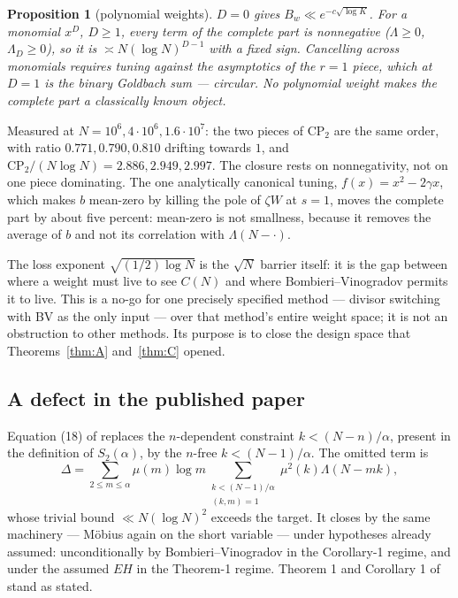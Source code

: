 \documentclass[11pt,a4paper]{article}
\theoremstyle{plain}
\newtheorem{proposition}[theorem]{Proposition}
\theoremstyle{definition}
\begin{document}
\begin{proposition}[polynomial weights]\label{prop:Dpp}
$D=0$ gives $B_w\ll e^{-c\sqrt{\log K}}$. For a monomial $x^D$,
$D\ge1$, every term of the complete part is nonnegative
($\Lambda\ge0$, $\Lambda_D\ge0$), so it is $\asymp N(\log N)^{D-1}$
with a fixed sign. Cancelling across monomials requires tuning against
the asymptotics of the $r=1$ piece, which at $D=1$ is the binary
Goldbach sum --- circular. No polynomial weight makes the complete
part a classically known object.
\end{proposition}

Measured at $N=10^6,4\cdot10^6,1.6\cdot10^7$: the two pieces of
$\mathrm{CP}_2$ are the same order, with ratio $0.771,0.790,0.810$
drifting towards $1$, and $\mathrm{CP}_2/(N\log N) = 2.886, 2.949,
2.997$. The closure rests on nonnegativity, not on one piece
dominating. The one analytically canonical tuning,
$f(x)=x^2-2\gamma x$, which makes $b$ mean-zero by killing the pole of
$\zeta W$ at $s=1$, moves the complete part by about five percent:
mean-zero is not smallness, because it removes the average of $b$ and
not its correlation with $\Lambda(N-\cdot)$.

The loss exponent $\sqrt{(1/2)\log N}$ is the $\sqrt N$ barrier itself:
it is the gap between where a weight must live to see $C(N)$ and where
Bombieri--Vinogradov permits it to live. This is a no-go for one
precisely specified method --- divisor switching with BV as the only
input --- over that method's entire weight space; it is not an
obstruction to other methods. Its purpose is to close the design space
that Theorems~\ref{thm:A} and~\ref{thm:C} opened.

\subsection{A defect in the published paper}

Equation (18) of \cite{HL} replaces the $n$-dependent constraint
$k < (N-n)/\alpha$, present in the definition of $S_2(\alpha)$, by the
$n$-free $k < (N-1)/\alpha$. The omitted term is
\[
  \Delta = \sum_{2\le m\le\alpha}\mu(m)\log m
    \sum_{\substack{k<(N-1)/\alpha\\ (k,m)=1}}\mu^2(k)\Lambda(N-mk),
\]
whose trivial bound $\ll N(\log N)^2$ exceeds the target. It closes by
the same machinery --- M\"obius again on the short variable --- under
hypotheses already assumed: unconditionally by Bombieri--Vinogradov in
the Corollary-1 regime, and under the assumed $EH$ in the Theorem-1
regime. Theorem 1 and Corollary 1 of \cite{HL} stand as stated.
\end{document}
